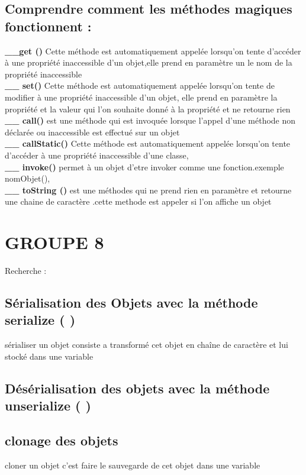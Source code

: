 \documentclass[12pt,b5paper]{article}
\begin{document}
\subsection{Comprendre comment les méthodes magiques fonctionnent :}
 \textbf{\_\_get ()} Cette méthode est automatiquement appelée lorsqu'on tente d'accéder à une propriété inaccessible d'un objet,elle prend en paramètre un le nom de la propriété inaccessible \\
\textbf{ \_\_ set() } Cette méthode est automatiquement appelée lorsqu'on tente de modifier à une propriété inaccessible d'un objet, elle prend en paramètre la propriété et la valeur qui l'on souhaite donné à la propriété et ne retourne rien \\
\textbf{ \_\_ call()} est une méthode qui est invoquée lorsque l'appel d'une méthode non déclarée ou inaccessible est eﬀectué sur
un objet\\
\textbf{\_\_ callStatic()} Cette méthode est automatiquement appelée lorsqu'on tente d'accéder à une propriété inaccessible d'une classe, \\
\textbf{\_\_ invoke()} permet à un objet d'etre invoker comme une fonction.exemple nomObjet(),\\
 \textbf{\_\_ toString ()} est une méthodes qui ne prend rien en paramètre et retourne une chaine de caractère .cette methode est appeler
si l'on affiche un objet\\
 
 
 
\section{GROUPE 8 } 
Recherche :
\subsection{Sérialisation des Objets avec la méthode serialize ( )}
sérialiser un objet consiste a transformé cet objet en chaîne de caractère et lui stocké dans une variable
\subsection{ Désérialisation des objets avec la méthode unserialize ( )}
\subsection{clonage des objets}
cloner un objet c'est faire le sauvegarde de cet objet dans une variable\\
\end{document}
